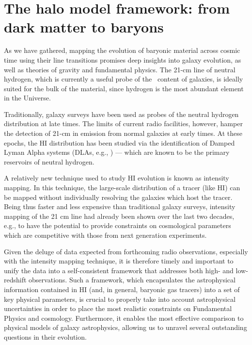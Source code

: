\section{The halo model framework: from dark matter to baryons}\label{s:HIhalomodel}

As we have gathered, mapping the evolution of baryonic material across cosmic time using their line transitions promises deep insights into galaxy evolution, as well as theories of gravity and fundamental physics. The 21-cm line of neutral hydrogen, which is currently a useful probe of the \HI\ content of galaxies, is ideally suited for the bulk of the material, since hydrogen is the most abundant element in the Universe. 

Traditionally, galaxy surveys have been used as probes of the neutral hydrogen distribution \cite{zwaan05, zwaan2005a, martin12} at late times. The limits of current radio facilities, however, hamper the detection of 21-cm in emission from normal galaxies at early times. At these epochs, the HI distribution has been studied via the identification of Damped Lyman Alpha systems (DLAs, e.g., \cite{noterdaeme12, zafar2013, crighton2015}) — which are known to be the primary reservoirs of neutral hydrogen. 

A relatively new technique used to study HI evolution is known as intensity mapping. In this technique, the large-scale distribution of a tracer (like HI) can be mapped without individually resolving the galaxies which host the tracer. Being thus faster and less expensive than traditional galaxy surveys, intensity mapping of the 21 cm line had already been shown over the last two decades, e.g., \cite{chang10, wyithe2008a, anderson2018} to have the potential to provide constraints on cosmological parameters which are competitive with those from next generation experiments. 

Given the deluge of data expected from forthcoming radio observations, especially with the intensity mapping technique, it is therefore
timely and important to unify the data into a self-consistent framework that addresses both high- and low-redshift observations. Such a framework, which encapsulates the astrophysical information contained in HI (and, in general, baryonic gas tracers) into a set of key physical parameters, is crucial to properly take into account astrophysical uncertainties in order to place the most realistic constraints on Fundamental Physics and cosmology. Furthermore, it enables the most effective comparison to physical models of galaxy astrophysics, allowing us to unravel several outstanding questions in their evolution.

